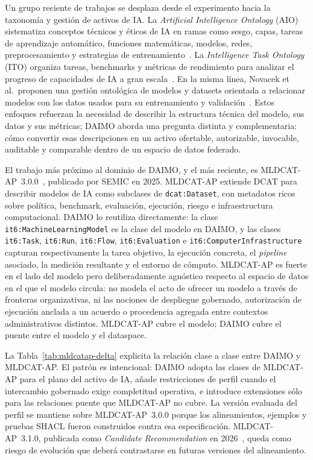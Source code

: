 \documentclass[Afour,sagev,times]{sagej}
\newcommand{\code}[1]{\texttt{#1}}
\begin{document}
Un grupo reciente de trabajos se desplaza desde el experimento hacia la taxonomía y gestión de activos de IA. La \emph{Artificial Intelligence Ontology} (AIO) sistematiza conceptos técnicos y éticos de IA en ramas como sesgo, capas, tareas de aprendizaje automático, funciones matemáticas, modelos, redes, preprocesamiento y estrategias de entrenamiento~\cite{aio}. La \emph{Intelligence Task Ontology} (ITO) organiza tareas, benchmarks y métricas de rendimiento para analizar el progreso de capacidades de IA a gran escala~\cite{ito}. En la misma línea, Novacek et al.\ proponen una gestión ontológica de modelos y datasets orientada a relacionar modelos con los datos usados para su entrenamiento y validación~\cite{novacek24}. Estos enfoques refuerzan la necesidad de describir la estructura técnica del modelo, sus datos y sus métricas; DAIMO aborda una pregunta distinta y complementaria: cómo convertir esas descripciones en un activo ofertable, autorizable, invocable, auditable y comparable dentro de un espacio de datos federado.

El trabajo más próximo al dominio de DAIMO, y el más reciente, es MLDCAT-AP~3.0.0~\cite{mldcatap}, publicado por SEMIC en 2025. MLDCAT-AP extiende DCAT para describir modelos de IA como subclases de \code{dcat:Dataset}, con metadatos ricos sobre política, benchmark, evaluación, ejecución, riesgo e infraestructura computacional. DAIMO lo reutiliza directamente: la clase \code{it6:MachineLearningModel} es la clase del modelo en DAIMO, y las clases \code{it6:Task}, \code{it6:Run}, \code{it6:Flow}, \code{it6:Evaluation} e \code{it6:ComputerInfrastructure} capturan respectivamente la tarea objetivo, la ejecución concreta, el \emph{pipeline} asociado, la medición resultante y el entorno de cómputo. MLDCAT-AP es fuerte en el lado del modelo pero deliberadamente agnóstico respecto al espacio de datos en el que el modelo circula: no modela el acto de ofrecer un modelo a través de fronteras organizativas, ni las nociones de despliegue gobernado, autorización de ejecución anclada a un acuerdo o procedencia agregada entre contextos administrativos distintos. MLDCAT-AP cubre el modelo; DAIMO cubre el puente entre el modelo y el dataspace.

La Tabla~\ref{tab:mldcatap-delta} explicita la relación clase a clase entre DAIMO y MLDCAT-AP. El patrón es intencional: DAIMO adopta las clases de MLDCAT-AP para el plano del activo de IA, añade restricciones de perfil cuando el intercambio gobernado exige completitud operativa, e introduce extensiones sólo para las relaciones puente que MLDCAT-AP no cubre. La versión evaluada del perfil se mantiene sobre MLDCAT-AP~3.0.0 porque los alineamientos, ejemplos y pruebas SHACL fueron construidos contra esa especificación. MLDCAT-AP~3.1.0, publicada como \emph{Candidate Recommendation} en 2026~\cite{mldcatap31}, queda como riesgo de evolución que deberá contrastarse en futuras versiones del alineamiento.
\end{document}
